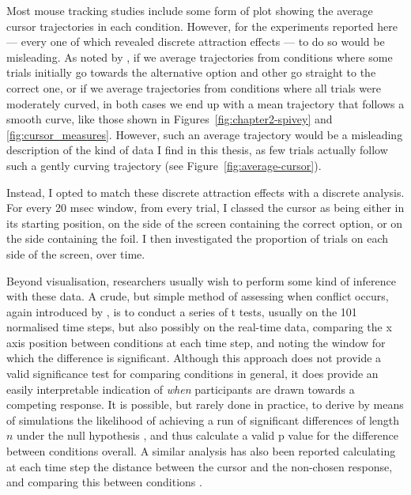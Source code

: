 Most mouse tracking studies include some form of plot
showing the average cursor trajectories in each condition.
However, for the experiments reported here
--- every one of which revealed discrete attraction effects ---
to do so would be misleading.
As noted by \citet{Spivey2005}, if we average
trajectories from conditions where
some trials initially go towards the alternative option
and other go straight to the correct one,
or if we average trajectories from conditions where
all trials were moderately curved,
in both cases we end up with a mean trajectory that follows a smooth curve,
like those shown in Figures~\ref{fig:chapter2-spivey} and \ref{fig:cursor_measures}.
However, such an average trajectory would be a misleading description
of the kind of data I find in this thesis,
as few trials actually follow such a gently curving trajectory
(see Figure~\ref{fig:average-cursor}).

Instead, I opted to match these discrete attraction effects
with a discrete analysis.
For every 20 msec window, from every trial,
I classed the cursor as being either
in its starting position,
on the side of the screen containing the correct option,
or on the side containing the foil.
I then investigated the proportion of trials
on each side of the screen, over time.

Beyond visualisation, researchers usually wish to
perform some kind of inference with these data.
A crude, but simple method of assessing when conflict occurs,
again introduced by \citet{Spivey2005},
is to conduct a series of t tests, 
usually on the 101 normalised time steps,
but also possibly on the real-time data,
comparing the x axis position between conditions at each time step,
and noting the window for which the difference is significant.
Although this approach does not provide
a valid significance test for comparing conditions in general,
it does provide an easily interpretable indication of
\emph{when} participants are drawn towards a competing response.
It is possible, but rarely done in practice,
to derive by means of simulations
the likelihood of achieving a run of significant differences 
of length $n$ under the null hypothesis \citep{Dale2007},
and thus calculate a valid p value for the difference between conditions overall.
A similar analysis has also been reported 
calculating at each time step
the distance between the cursor and the non-chosen response,
and comparing this between conditions \citep{Falke2013}.

